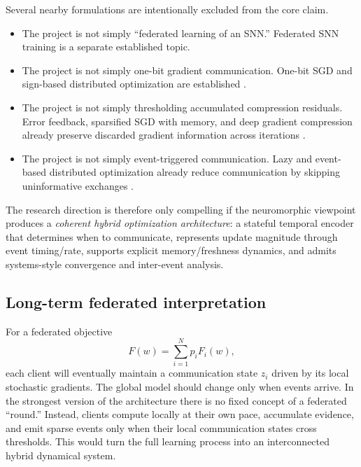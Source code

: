 Several nearby formulations are intentionally excluded from the core claim.
\begin{itemize}
  \item The project is not simply ``federated learning of an SNN.'' Federated SNN training is a separate established topic.
  \item The project is not simply one-bit gradient communication. One-bit SGD and sign-based distributed optimization are established \citep{seide2014onebit,bernstein2018signsgd}.
  \item The project is not simply thresholding accumulated compression residuals. Error feedback, sparsified SGD with memory, and deep gradient compression already preserve discarded gradient information across iterations \citep{lin2017dgc,stich2018memory,richtarik2021ef21}.
  \item The project is not simply event-triggered communication. Lazy and event-based distributed optimization already reduce communication by skipping uninformative exchanges \citep{chen2018lag,er2025eventbased}.
\end{itemize}

The research direction is therefore only compelling if the neuromorphic viewpoint produces a \emph{coherent hybrid optimization architecture}: a stateful temporal encoder that determines when to communicate, represents update magnitude through event timing/rate, supports explicit memory/freshness dynamics, and admits systems-style convergence and inter-event analysis.

\subsection{Long-term federated interpretation}

For a federated objective
\begin{equation}
  F(w)=\sum_{i=1}^N p_i F_i(w),
\end{equation}
each client will eventually maintain a communication state $z_i$ driven by its local stochastic gradients. The global model should change only when events arrive. In the strongest version of the architecture there is no fixed concept of a federated ``round.'' Instead, clients compute locally at their own pace, accumulate evidence, and emit sparse events only when their local communication states cross thresholds. This would turn the full learning process into an interconnected hybrid dynamical system.
